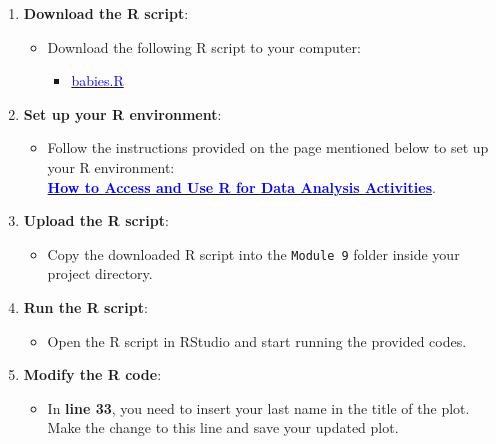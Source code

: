 \documentclass[oneside,openany]{book}
\providecommand{\tightlist}{%
  \setlength{\itemsep}{0pt}\setlength{\parskip}{0pt}}
\begin{document}
\begin{enumerate}
\def\labelenumi{\arabic{enumi}.}
\tightlist
\item
  \textbf{Download the R script}:

  \begin{itemize}
  \tightlist
  \item
    Download the following R script to your computer:

    \begin{itemize}
    \tightlist
    \item
      \href{https://raw.githubusercontent.com/aslemand/Data-Analysis-Activities/main/data/Activity_8/babies.R}{\textcolor{blue}{babies.R}}
    \end{itemize}
  \end{itemize}
\item
  \textbf{Set up your R environment}:

  \begin{itemize}
  \tightlist
  \item
    Follow the instructions provided on the page mentioned below to set up your R environment:\\
    \hyperref[how-to-set-up-r-for-data-analysis-activities]{\textcolor{blue}{\textbf{How to Access and Use R for Data Analysis Activities}}}.
  \end{itemize}
\item
  \textbf{Upload the R script}:

  \begin{itemize}
  \tightlist
  \item
    Copy the downloaded R script into the \texttt{Module\ 9} folder inside your project directory.
  \end{itemize}
\item
  \textbf{Run the R script}:

  \begin{itemize}
  \tightlist
  \item
    Open the R script in RStudio and start running the provided codes.
  \end{itemize}
\item
  \textbf{Modify the R code}:

  \begin{itemize}
  \tightlist
  \item
    In \textbf{line 33}, you need to insert your last name in the title of the plot. Make the change to this line and save your updated plot.
  \end{itemize}


\end{enumerate}
\end{document}
